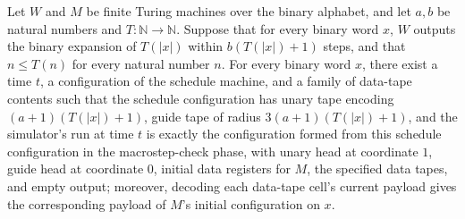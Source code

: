 \begin{lemma}
\label{Complexity.dataTM_ready}
\leanok
{}
Let $W$ and $M$ be finite Turing machines over the binary alphabet, and let $a,b$ be
natural numbers and $T:\mathbb{N}\to\mathbb{N}$. Suppose that for every binary word $x$,
$W$ outputs the binary expansion of $T(|x|)$ within $b(T(|x|)+1)$ steps, and that $n\le
T(n)$ for every natural number $n$. For every binary word $x$, there exist a time $t$, a
configuration of the schedule machine, and a family of data-tape contents such that the
schedule configuration has unary tape encoding $(a+1)(T(|x|)+1)$, guide tape of radius
$3(a+1)(T(|x|)+1)$, and the simulator's run at time $t$ is exactly the configuration
formed from this schedule configuration in the macrostep-check phase, with unary head at
coordinate $1$, guide head at coordinate $0$, initial data registers for $M$, the
specified data tapes, and empty output; moreover, decoding each data-tape cell's current
payload gives the corresponding payload of $M$'s initial configuration on $x$.
\end{lemma}

